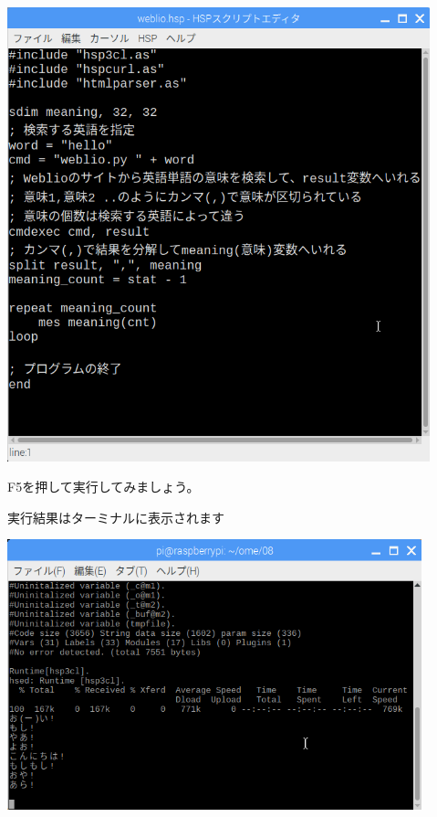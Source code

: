 \documentclass[a4paper,12pt,dvipdfmx]{jarticle}
\begin{document}
\begin{center}
\includegraphics[width=12.243cm]{textbook-img047.png}

\end{center}


\bigskip


\bigskip

F5を押して実行してみましょう。

実行結果はターミナルに表示されます



\begin{center}
\includegraphics[width=12.012cm]{textbook-img048.png}

\end{center}
\end{document}

